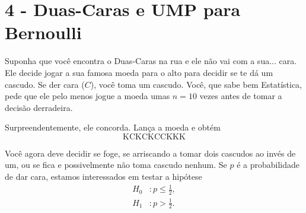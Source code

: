 \documentclass[a4paper,10pt, notitlepage]{report}
\newcommand{\mysection}[2]{\setcounter{section}{#1}\addtocounter{section}{-1}\section*{#1 - #2}}
\begin{document}
	\mysection{4}{Duas-Caras e UMP para Bernoulli}
	
	Suponha que você encontra o Duas-Caras na rua e ele não vai com a sua... cara. 
	Ele decide jogar a sua famosa moeda para o alto para decidir se te dá um cascudo.
	Se der cara ($C$), você toma um cascudo.
	Você, que sabe bem Estatística, pede que ele pelo menos jogue a moeda umas $n=10$ vezes antes de tomar a decisão derradeira.
	
	Surpreendentemente, ele concorda. 
	Lança a moeda e obtém
	$$ \text{KCKCKCCKKK} $$
	
	Você agora deve decidir se foge, se arriscando a tomar dois cascudos ao invés de um, ou se fica e  possivelmente não toma cascudo nenhum.
	Se $p$ é a probabilidade de dar cara, estamos interessados em testar a hipótese
	\begin{align*}
	H_0 &:  p \leq \frac{1}{2},\\
	H_1 &:p > \frac{1}{2}.
	\end{align*}
	
\end{document}

